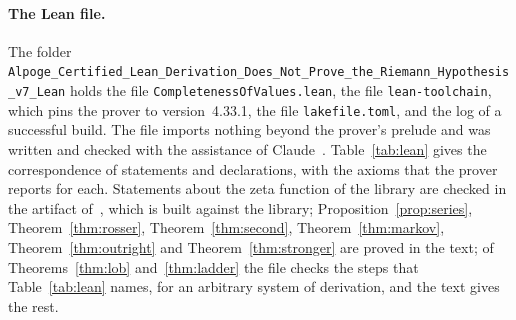 \documentclass[11pt]{article}
\theoremstyle{definition}
\theoremstyle{remark}
\begin{document}
\paragraph{The Lean file.} The folder \nolinkurl{Alpoge_Certified_Lean_Derivation_Does_Not_Prove_the_Riemann_Hypothesis_v7_Lean} holds the file \nolinkurl{CompletenessOfValues.lean}, the file \nolinkurl{lean-toolchain}, which pins the prover to version~4.33.1, the file \nolinkurl{lakefile.toml}, and the log of a successful build. The file imports nothing beyond the prover's prelude and was written and checked with the assistance of Claude~\citep{claude}. Table~\ref{tab:lean} gives the correspondence of statements and declarations, with the axioms that the prover reports for each. Statements about the zeta function of the library are checked in the artifact of~\citet{tv}, which is built against the library; Proposition~\ref{prop:series}, Theorem~\ref{thm:rosser}, Theorem~\ref{thm:second}, Theorem~\ref{thm:markov}, Theorem~\ref{thm:outright} and Theorem~\ref{thm:stronger} are proved in the text; of Theorems~\ref{thm:lob} and~\ref{thm:ladder} the file checks the steps that Table~\ref{tab:lean} names, for an arbitrary system of derivation, and the text gives the rest.
\end{document}
